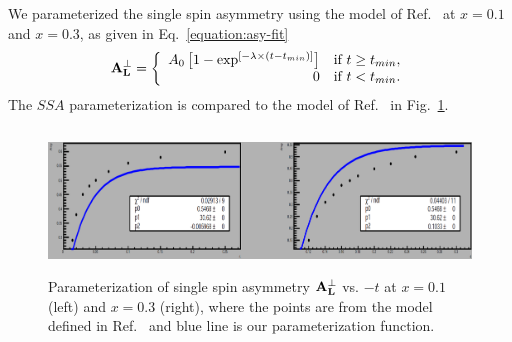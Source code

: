 We parameterized the single spin asymmetry using the model of Ref.~\cite{Fr00}
at $x=0.1$ and $x=0.3$, as given in Eq.~\ref{equation:asy-fit}
\begin{equation}
        \bf{A_{L}^{\perp}} = \left\{
        \begin{array}{rl}
        A_{0} \left[ 1 - \exp^{ [ -\lambda \times ( t - t_{min} ) ] } \right] &
        \text{if } t \ge t_{min}, \\ 0 & \text{if } t < t_{min}.
        \end{array} \right.
     \label{equation:asy-fit}
\end{equation}
The $SSA$ parameterization is compared to the model of Ref.~\cite{Fr00} in
Fig.~\ref{fig:asym-1}.

\begin{figure}[!hbt]
    \centering
    \includegraphics[width=6.0in,height=1.5in]{./figures/asym_3.pdf}
    \caption{Parameterization of single spin asymmetry $\bf{A_{L}^{\perp}}$
      vs. $-t$ at $x=0.1$ (left) and $x=0.3$ (right), where the points are from
      the model defined in Ref.~\cite{Fr00} and blue line is our
      parameterization function.}
    \label{fig:asym-1}
\end{figure}
